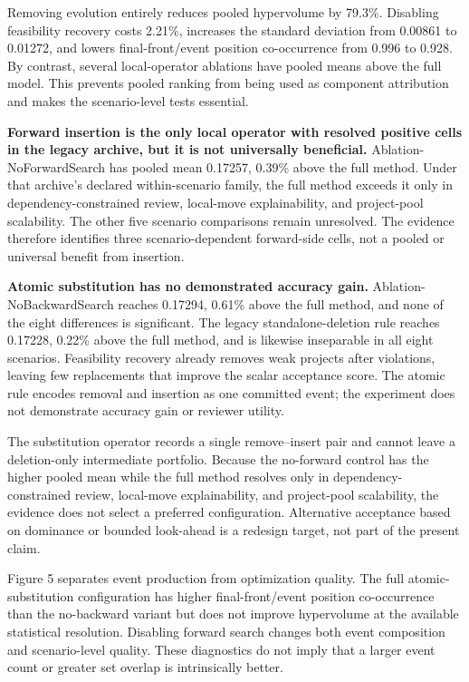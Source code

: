 \documentclass[applsci,article,submit,moreauthors]{Definitions/mdpi}
\begin{document}
Removing evolution entirely reduces pooled hypervolume by 79.3\%. Disabling feasibility recovery costs 2.21\%, increases the standard deviation from 0.00861 to 0.01272, and lowers final-front/event position co-occurrence from 0.996 to 0.928. By contrast, several local-operator ablations have pooled means above the full model. This prevents pooled ranking from being used as component attribution and makes the scenario-level tests essential.

\textbf{Forward insertion is the only local operator with resolved positive cells in the legacy archive, but it is not universally beneficial.} Ablation-NoForwardSearch has pooled mean 0.17257, 0.39\% above the full method. Under that archive's declared within-scenario family, the full method exceeds it only in dependency-constrained review, local-move explainability, and project-pool scalability. The other five scenario comparisons remain unresolved. The evidence therefore identifies three scenario-dependent forward-side cells, not a pooled or universal benefit from insertion.

\textbf{Atomic substitution has no demonstrated accuracy gain.} Ablation-NoBackwardSearch reaches 0.17294, 0.61\% above the full method, and none of the eight differences is significant. The legacy standalone-deletion rule reaches 0.17228, 0.22\% above the full method, and is likewise inseparable in all eight scenarios. Feasibility recovery already removes weak projects after violations, leaving few replacements that improve the scalar acceptance score. The atomic rule encodes removal and insertion as one committed event; the experiment does not demonstrate accuracy gain or reviewer utility.

The substitution operator records a single remove--insert pair and cannot leave a deletion-only intermediate portfolio. Because the no-forward control has the higher pooled mean while the full method resolves only in dependency-constrained review, local-move explainability, and project-pool scalability, the evidence does not select a preferred configuration. Alternative acceptance based on dominance or bounded look-ahead is a redesign target, not part of the present claim.

Figure 5 separates event production from optimization quality. The full atomic-substitution configuration has higher final-front/event position co-occurrence than the no-backward variant but does not improve hypervolume at the available statistical resolution. Disabling forward search changes both event composition and scenario-level quality. These diagnostics do not imply that a larger event count or greater set overlap is intrinsically better.
\end{document}
